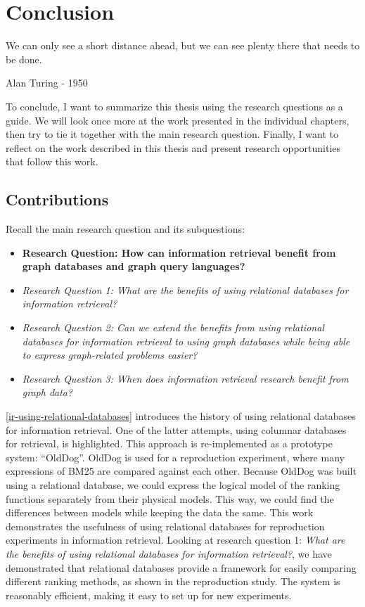 \chapter{Conclusion}
\label{conclusion}
\epigraph{We can only see a short distance ahead, but we can see plenty there that needs to be done.}{Alan Turing - 1950}

To conclude, I want to summarize this thesis using the research questions as a guide. We will look once more at the work presented in the individual chapters, then try to tie it together with the main research question. Finally, I want to reflect on the work described in this thesis and present research opportunities that follow this work.

\section{Contributions}
Recall the main research question and its subquestions:
\begin{itemize}
	\item \textbf{Research Question: How can information retrieval benefit from graph databases and graph query languages?}
	\item \emph{Research Question 1: What are the benefits of using relational databases for information retrieval?} 
	\item \emph{Research Question 2: Can we extend the benefits from using relational databases for information retrieval to using graph databases while being able to express graph-related problems easier?} 
	\item \emph{Research Question 3: When does information retrieval research benefit from graph data?} 
\end{itemize}

\cref{ir-using-relational-databases} introduces the history of using relational databases for information retrieval. One of the latter attempts, using columnar databases for retrieval, is highlighted. This approach is re-implemented as a prototype system: ``OldDog''. OldDog is used for a reproduction experiment, where many expressions of BM25 are compared against each other. Because OldDog was built using a relational database, we could express the logical model of the ranking functions separately from their physical models. This way, we could find the differences between models while keeping the data the same. This work demonstrates the usefulness of using relational databases for reproduction experiments in information retrieval. Looking at research question 1: \emph{What are the benefits of using relational databases for information retrieval?}, we have demonstrated that relational databases provide a framework for easily comparing different ranking methods, as shown in the reproduction study. The system is reasonably efficient, making it easy to set up for new experiments. 

